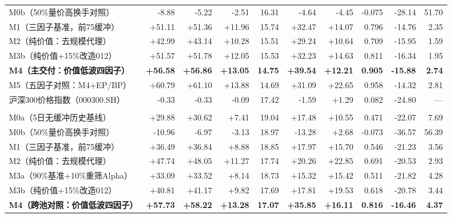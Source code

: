 \documentclass[12pt,a4paper]{article}
\begin{document}
\begin{minipage}{\textwidth}
\begin{tabularx}{\textwidth}{@{}X r r r r r r r r r@{}}
    M0b（50\%量价高换手对照） & -8.88 & -5.22 & -2.51 & 16.31 & -4.64 & -4.45 & -0.075 & -28.14 & 51.70 \\
    M1（三因子基准，前75缓冲） & +51.11 & +51.36 & +11.96 & 15.74 & +32.47 & +14.07 & 0.796 & -14.76 & 2.35 \\
    M2（纯价值：去规模代理） & +42.99 & +43.14 & +10.28 & 15.51 & +29.24 & +10.64 & 0.709 & -15.95 & 1.59 \\
    M3b（纯价值+15\%改造012） & +51.57 & +51.78 & +12.05 & 15.53 & +32.23 & +14.63 & 0.811 & -16.34 & 1.95 \\
    \textbf{\textcolor{Primary}{M4（主交付：价值低波四因子）}} & \textbf{\textcolor{Primary}{+56.58}} & \textbf{+56.86} & \textbf{+13.05} & \textbf{14.75} & \textbf{+39.54} & \textbf{+12.21} & \textbf{\textcolor{Primary}{0.905}} & \textbf{-15.88} & \textbf{2.74} \\
    M5（五因子对照：M4+EP/BP） & +60.79 & +61.10 & +13.88 & 14.69 & +31.09 & +22.65 & 0.958 & -14.32 & 2.81 \\
    沪深300价格指数（000300.SH） & -0.33 & -0.33 & -0.09 & 17.42 & -1.59 & +1.29 & 0.082 & -24.80 & — \\
    \arrayrulecolor{RuleMuted}\midrule[0.4pt]
    \multicolumn{10}{@{}l}{\textbf{\sffamily\textcolor{Primary}{B. 中证500股票池（历史基线 M0a / M0b；共同池消融 M1 至 M5）}}}\\[1pt]
    M0a（5日无缓冲历史基线） & +29.88 & +30.62 & +7.41 & 19.04 & +17.48 & +10.55 & 0.471 & -22.07 & 7.69 \\
    M0b（50\%量价高换手对照） & -10.96 & -6.97 & -3.13 & 18.97 & -13.28 & +2.68 & -0.073 & -36.57 & 56.39 \\
    M1（三因子基准，前75缓冲） & +36.49 & +36.84 & +8.88 & 18.85 & +17.97 & +15.70 & 0.546 & -21.23 & 3.56 \\
    M2（纯价值：去规模代理） & +47.74 & +48.05 & +11.27 & 17.74 & +20.26 & +22.85 & 0.691 & -20.53 & 2.93 \\
    M3a（90\%基准+10\%重筛Alpha） & +33.09 & +33.52 & +8.14 & 18.73 & +15.32 & +15.42 & 0.511 & -21.82 & 4.28 \\
    M3b（纯价值+15\%改造012） & +40.81 & +41.17 & +9.82 & 17.69 & +17.81 & +19.53 & 0.618 & -20.78 & 3.44 \\
    \textbf{\textcolor{Primary}{M4（跨池对照：价值低波四因子）}} & \textbf{\textcolor{Primary}{+57.73}} & \textbf{+58.22} & \textbf{+13.28} & \textbf{17.07} & \textbf{+35.85} & \textbf{+16.11} & \textbf{\textcolor{Primary}{0.816}} & \textbf{\textcolor{Primary}{-16.46}} & \textbf{4.37} \\

\end{tabularx}
\end{minipage}
\end{document}
